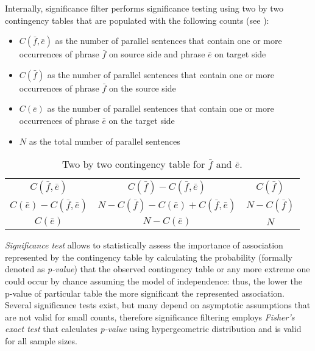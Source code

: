 Internally, significance filter performs significance testing using two by two
contingency tables that are populated with the following counts (see
):
\begin{itemize}
  \item $C(\bar{f},\bar{e})$ as the number of parallel sentences that contain one or more
    occurrences of phrase $\bar{f}$ on source side and phrase $\bar{e}$ on target side
  \item $C(\bar{f})$ as the number of parallel sentences that contain one or more
    occurrences of phrase $\bar{f}$ on the source side
  \item $C(\bar{e})$ as the number of parallel sentences that contain one or more
    occurrences of phrase $\bar{e}$ on the target side
  \item $N$ as the total number of parallel sentences
\end{itemize}

\begin{table}[ht]
\centering
\def\arraystretch{1.5}
\begin{tabular}{ | c c | c | }
\hline
$C(\bar{f},\bar{e})$  &  $C(\bar{f}) - C(\bar{f},\bar{e})$  &  $C(\bar{f})$ \\
$C(\bar{e}) - C(\bar{f},\bar{e})$  &  $N - C(\bar{f}) - C(\bar{e}) + C(\bar{f},\bar{e})$  & $N - C(\bar{f})$ \\
\hline
$C(\bar{e})$  &  $N - C(\bar{e})$  &  $N$ \\
\hline
\end{tabular}
\caption{\label{two-by-two-contingency-table}
Two by two contingency table for $\bar{f}$ and $\bar{e}$.}
\end{table}

\emph{Significance test} allows to statistically assess the importance of association
represented by the contingency table by calculating the probability (formally denoted
as \emph{p-value}) that the observed contingency table or any more extreme one could
occur by chance assuming the model of independence: thus, the lower the p-value of
particular table the more significant the represented association.
Several significance tests exist, but many depend on asymptotic assumptions
that are not valid for small counts, therefore significance filtering employs
\emph{Fisher's exact test} that calculates \emph{p-value} using hypergeometric
distribution and is valid for all sample sizes.


